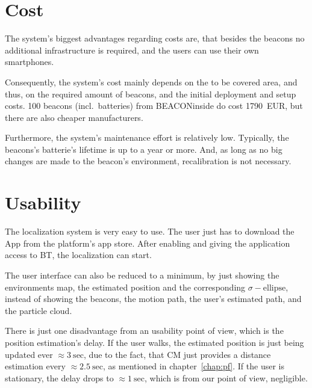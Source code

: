 \section{Cost}
The system's biggest advantages regarding costs are, that besides the beacons no additional infrastructure is required, and the users can use their own smartphones.

Consequently, the system's cost mainly depends on the to be covered area, and thus, on the required amount of beacons, and the initial deployment and setup costs. 100 beacons (incl.\ batteries) from BEACONinside do cost 1790~EUR, but there are also cheaper manufacturers.

Furthermore, the system's maintenance effort is relatively low. Typically, the beacons's batterie's lifetime is up to a year or more. And, as long as no big changes are made to the beacon's environment, recalibration is not necessary.

\section{Usability}
The localization system is very easy to use. The user just has to download the App from the platform's app store. After enabling and giving the application access to \acl{BT}, the localization can start.

The user interface can also be reduced to a minimum, by just showing the environments map, the estimated position and the corresponding $\sigma-\text{ellipse}$, instead of showing the beacons, the motion path, the user's estimated path, and the particle cloud.

There is just one disadvantage from an usability point of view, which is the position estimation's delay. If the user walks, the estimated position is just being updated ever $\approx 3~\text{sec}$, due to the fact, that \acs{CM} just provides a distance estimation every $\approx 2.5~\text{sec}$, as mentioned in chapter~\ref{chap:pf}. If the user is stationary, the delay drops to $\approx 1~\text{sec}$, which is from our point of view, negligible. 
